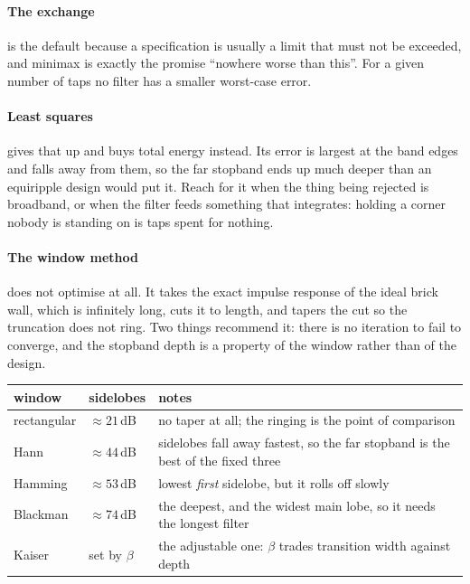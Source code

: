 \documentclass[11pt,a4paper]{article}
\begin{document}
\paragraph{The exchange} is the default because a specification is usually a
limit that must not be exceeded, and minimax is exactly the promise ``nowhere
worse than this''. For a given number of taps no filter has a smaller worst-case
error.

\paragraph{Least squares} gives that up and buys total energy instead. Its error
is largest at the band edges and falls away from them, so the far stopband ends
up much deeper than an equiripple design would put it. Reach for it when the
thing being rejected is broadband, or when the filter feeds something that
integrates: holding a corner nobody is standing on is taps spent for nothing.

\paragraph{The window method} does not optimise at all. It takes the exact
impulse response of the ideal brick wall, which is infinitely long, cuts it to
length, and tapers the cut so the truncation does not ring. Two things recommend
it: there is no iteration to fail to converge, and the stopband depth is a
property of the window rather than of the design.

\begin{tabularx}{\textwidth}{@{}llY@{}}
  \toprule
  \textbf{window} & \textbf{sidelobes} & \textbf{notes} \\
  \midrule
  rectangular & ${\approx}21$\,dB & no taper at all; the ringing is the point of
    comparison \\
  Hann & ${\approx}44$\,dB & sidelobes fall away fastest, so the far stopband is
    the best of the fixed three \\
  Hamming & ${\approx}53$\,dB & lowest \emph{first} sidelobe, but it rolls off
    slowly \\
  Blackman & ${\approx}74$\,dB & the deepest, and the widest main lobe, so it
    needs the longest filter \\
  Kaiser & set by $\beta$ & the adjustable one: $\beta$ trades transition width
    against depth \\
  \bottomrule
\end{tabularx}
\end{document}
